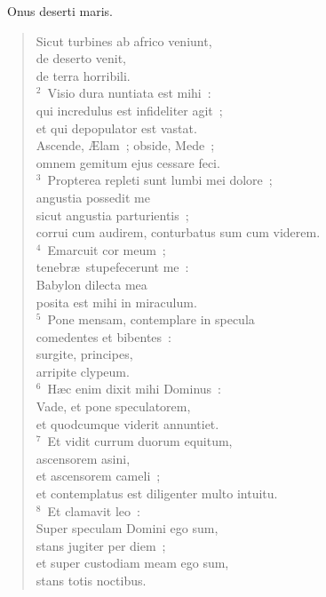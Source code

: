 ~\lettrine[lines=10,image=true,loversize=0.05,lraise=-0.03]{O}{}nus deserti maris. \begin{flushleft}\begin{verse}\vspace{6pt}Sicut turbines ab africo veniunt,\\ de deserto venit,\\ de terra horribili.\\
${}^{2}$~Visio dura nuntiata est mihi~:\\ qui incredulus est infideliter agit~;\\ et qui depopulator est vastat.\\ Ascende, \AE lam~; obside, Mede~;\\ omnem gemitum ejus cessare feci.\\
${}^{3}$~Propterea repleti sunt lumbi mei dolore~;\\ angustia possedit me\\ sicut angustia parturientis~;\\ corrui cum audirem, conturbatus sum cum viderem.\\
${}^{4}$~Emarcuit cor meum~;\\ tenebr\ae\ stupefecerunt me~:\\ Babylon dilecta mea\\ posita est mihi in miraculum.\\
${}^{5}$~Pone mensam, contemplare in specula\\ comedentes et bibentes~:\\ surgite, principes,\\ arripite clypeum.\\
${}^{6}$~H\ae c enim dixit mihi Dominus~:\\ Vade, et pone speculatorem,\\ et quodcumque viderit annuntiet.\\
${}^{7}$~Et vidit currum duorum equitum,\\ ascensorem asini,\\ et ascensorem cameli~;\\ et contemplatus est diligenter multo intuitu.\\
${}^{8}$~Et clamavit leo~:\\ Super speculam Domini ego sum,\\ stans jugiter per diem~;\\ et super custodiam meam ego sum,\\ stans totis noctibus.\\

\end{verse}
\end{flushleft}
